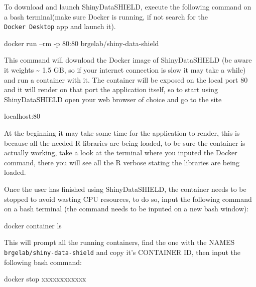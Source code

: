 \documentclass[
]{book}
\newenvironment{Shaded}{\begin{snugshade}}{\end{snugshade}}
\newcommand{\ExtensionTok}[1]{#1}
\newcommand{\NormalTok}[1]{#1}
\begin{document}
To download and launch ShinyDataSHIELD, execute the following command on a bash terminal(make sure Docker is running, if not search for the \texttt{Docker\ Desktop} app and launch it).

\begin{Shaded}
\begin{Highlighting}[]
\ExtensionTok{docker}\NormalTok{ run --rm -p 80:80 brgelab/shiny-data-shield}
\end{Highlighting}
\end{Shaded}

This command will download the Docker image of ShinyDataSHIELD (be aware it weights \textasciitilde{} 1.5 GB, so if your internet connection is slow it may take a while) and run a container with it. The container will be exposed on the local port 80 and it will render on that port the application itself, so to start using ShinyDataSHIELD open your web browser of choice and go to the site

\begin{Shaded}
\begin{Highlighting}[]
\ExtensionTok{localhost}\NormalTok{:80}
\end{Highlighting}
\end{Shaded}

At the beginning it may take some time for the application to render, this is because all the needed R libraries are being loaded, to be sure the container is actually working, take a look at the terminal where you inputed the Docker command, there you will see all the R verbose stating the libraries are being loaded.

Once the user has finished using ShinyDataSHIELD, the container needs to be stopped to avoid wasting CPU resources, to do so, input the following command on a bash terminal (the command needs to be inputed on a new bash window):

\begin{Shaded}
\begin{Highlighting}[]
\ExtensionTok{docker}\NormalTok{ container ls}
\end{Highlighting}
\end{Shaded}

This will prompt all the running containers, find the one with the NAMES \texttt{brgelab/shiny-data-shield} and copy it's CONTAINER ID, then input the following bash command:

\begin{Shaded}
\begin{Highlighting}[]
\ExtensionTok{docker}\NormalTok{ stop xxxxxxxxxxxx}
\end{Highlighting}
\end{Shaded}
\end{document}
